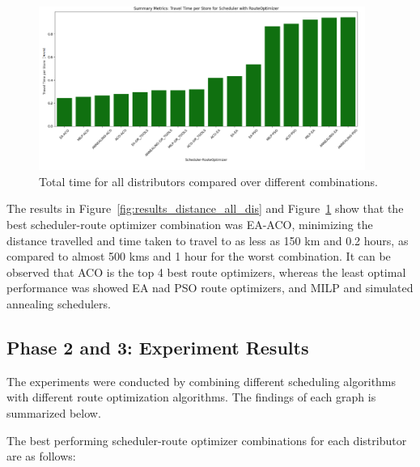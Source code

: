 \begin{figure}[H]
    \centering
    \includegraphics[width=0.95\textwidth]{images/results_time_all_dis}
    \caption{Total time for all distributors compared over different combinations.}
    \label{fig:results_time_all_dis}
\end{figure}

The results in Figure~\ref{fig:results_distance_all_dis} and Figure~\ref{fig:results_time_all_dis} show that the best scheduler-route optimizer combination was EA-ACO, minimizing the distance travelled and time taken to travel to as less as 150 km and 0.2 hours, as compared to almost 500 kms and 1 hour for the worst combination. 
It can be observed that ACO is the top 4 best route optimizers, whereas the least optimal performance was showed EA nad PSO route optimizers, and MILP and simulated annealing schedulers.


\subsection{Phase 2 and 3: Experiment Results}
The experiments were conducted by combining different scheduling algorithms with different route optimization algorithms. The findings of each graph is summarized below.



The best performing scheduler-route optimizer combinations for each distributor are as follows:

\begin{table}[H]
    \centering
    \caption{Best performing Scheduler-Route Optimizer combinations by distributor}
    \label{tab:best_schedulers}
    \end{table}
    

